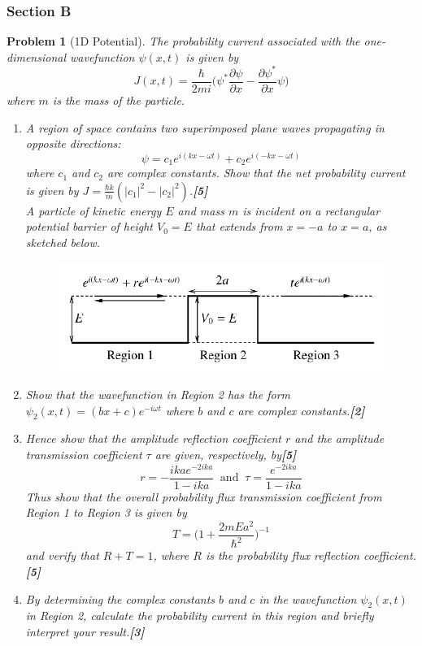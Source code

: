 \documentclass[a4paper]{article}
\theoremstyle{new}
\newtheorem{qns}{Problem}[subsection]
\begin{document}
\subsubsection{Section B}
\begin{qns}[1D Potential]
The probability current associated with the one-dimensional wavefunction $\psi(x,t)$ is given by
$$J(x,t)=\frac{\hbar}{2mi}\bigg(\psi^*\frac{\partial\psi}{\partial x}-\frac{\partial\psi^*}{\partial x}\psi\bigg)$$
where $m$ is the mass of the particle.
\begin{enumerate}[label=(\roman*)]
\item A region of space contains two superimposed plane waves propagating in opposite directions:
$$\psi=c_1e^{i(kx-\omega t)}+c_2e^{i(-kx-\omega t)}$$
where $c_1$ and $c_2$ are complex constants. Show that the net probability current is given by $J=\frac{\hbar k}{m}(|c_1|^2-|c_2|^2)$.\hfill\textbf{[5]}\\[5pt]
A particle of kinetic energy $E$ and mass $m$ is incident on a rectangular potential barrier of height $V_0=E$ that extends from $x=-a$ to $x = a$, as sketched below.
\begin{figure}[H]
    \centering
    \includegraphics[scale=0.5]{2016P1B6Q.PNG}
\end{figure}
\item Show that the wavefunction in Region 2 has the form  $\psi_2(x,t)=(bx+c)e^{-i\omega t}$ where $b$ and $c$ are complex constants.\hfill\textbf{[2]}
\item Hence show that the amplitude reflection coefficient $r$ and the amplitude transmission coefficient $\tau$ are given, respectively, by\hfill\textbf{[5]}
$$r=-\frac{ikae^{-2ika}}{1-ika}~\text{ and }~\tau=\frac{e^{-2ika}}{1-ika}$$
Thus show that the overall probability flux transmission coefficient from Region 1 to Region 3 is given by
$$T=\bigg(1+\frac{2mEa^2}{\hbar^2}\bigg)^{-1}$$
and verify that $R + T = 1$, where $R$ is the probability flux reflection coefficient.\hfill\textbf{[5]}
\item By determining the complex constants $b$ and $c$ in the wavefunction $\psi_2(x,t)$ in Region 2, calculate the probability current in this region and briefly interpret your result.\hfill\textbf{[3]}
\end{enumerate}
\end{qns}
\end{document}
